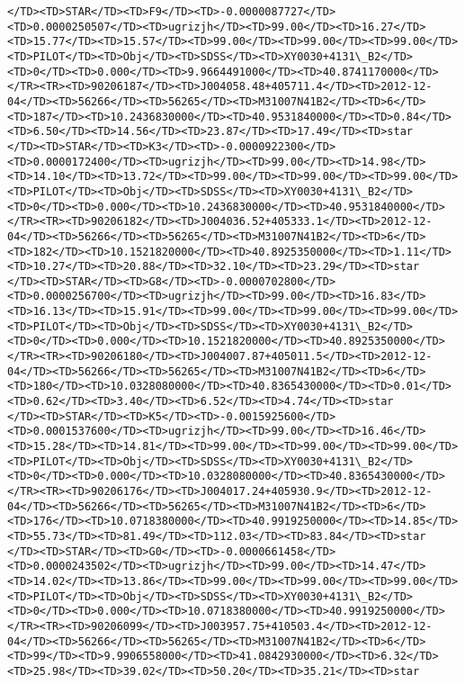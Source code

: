 \documentclass[11pt]{article}
\begin{document}
\begin{Verbatim}[commandchars=\\\{\}]
</TD><TD>STAR</TD><TD>F9</TD><TD>-0.0000087727</TD><TD>0.0000250507</TD><TD>ugrizjh</TD><TD>99.00</TD><TD>16.27</TD><TD>15.77</TD><TD>15.57</TD><TD>99.00</TD><TD>99.00</TD><TD>99.00</TD><TD>PILOT</TD><TD>Obj</TD><TD>SDSS</TD><TD>XY0030+4131\_B2</TD><TD>0</TD><TD>0.000</TD><TD>9.9664491000</TD><TD>40.8741170000</TD></TR><TR><TD>90206187</TD><TD>J004058.48+405711.4</TD><TD>2012-12-04</TD><TD>56266</TD><TD>56265</TD><TD>M31007N41B2</TD><TD>6</TD><TD>187</TD><TD>10.2436830000</TD><TD>40.9531840000</TD><TD>0.84</TD><TD>6.50</TD><TD>14.56</TD><TD>23.87</TD><TD>17.49</TD><TD>star      </TD><TD>STAR</TD><TD>K3</TD><TD>-0.0000922300</TD><TD>0.0000172400</TD><TD>ugrizjh</TD><TD>99.00</TD><TD>14.98</TD><TD>14.10</TD><TD>13.72</TD><TD>99.00</TD><TD>99.00</TD><TD>99.00</TD><TD>PILOT</TD><TD>Obj</TD><TD>SDSS</TD><TD>XY0030+4131\_B2</TD><TD>0</TD><TD>0.000</TD><TD>10.2436830000</TD><TD>40.9531840000</TD></TR><TR><TD>90206182</TD><TD>J004036.52+405333.1</TD><TD>2012-12-04</TD><TD>56266</TD><TD>56265</TD><TD>M31007N41B2</TD><TD>6</TD><TD>182</TD><TD>10.1521820000</TD><TD>40.8925350000</TD><TD>1.11</TD><TD>10.27</TD><TD>20.88</TD><TD>32.10</TD><TD>23.29</TD><TD>star      </TD><TD>STAR</TD><TD>G8</TD><TD>-0.0000702800</TD><TD>0.0000256700</TD><TD>ugrizjh</TD><TD>99.00</TD><TD>16.83</TD><TD>16.13</TD><TD>15.91</TD><TD>99.00</TD><TD>99.00</TD><TD>99.00</TD><TD>PILOT</TD><TD>Obj</TD><TD>SDSS</TD><TD>XY0030+4131\_B2</TD><TD>0</TD><TD>0.000</TD><TD>10.1521820000</TD><TD>40.8925350000</TD></TR><TR><TD>90206180</TD><TD>J004007.87+405011.5</TD><TD>2012-12-04</TD><TD>56266</TD><TD>56265</TD><TD>M31007N41B2</TD><TD>6</TD><TD>180</TD><TD>10.0328080000</TD><TD>40.8365430000</TD><TD>0.01</TD><TD>0.62</TD><TD>3.40</TD><TD>6.52</TD><TD>4.74</TD><TD>star      </TD><TD>STAR</TD><TD>K5</TD><TD>-0.0015925600</TD><TD>0.0001537600</TD><TD>ugrizjh</TD><TD>99.00</TD><TD>16.46</TD><TD>15.28</TD><TD>14.81</TD><TD>99.00</TD><TD>99.00</TD><TD>99.00</TD><TD>PILOT</TD><TD>Obj</TD><TD>SDSS</TD><TD>XY0030+4131\_B2</TD><TD>0</TD><TD>0.000</TD><TD>10.0328080000</TD><TD>40.8365430000</TD></TR><TR><TD>90206176</TD><TD>J004017.24+405930.9</TD><TD>2012-12-04</TD><TD>56266</TD><TD>56265</TD><TD>M31007N41B2</TD><TD>6</TD><TD>176</TD><TD>10.0718380000</TD><TD>40.9919250000</TD><TD>14.85</TD><TD>55.73</TD><TD>81.49</TD><TD>112.03</TD><TD>83.84</TD><TD>star      </TD><TD>STAR</TD><TD>G0</TD><TD>-0.0000661458</TD><TD>0.0000243502</TD><TD>ugrizjh</TD><TD>99.00</TD><TD>14.47</TD><TD>14.02</TD><TD>13.86</TD><TD>99.00</TD><TD>99.00</TD><TD>99.00</TD><TD>PILOT</TD><TD>Obj</TD><TD>SDSS</TD><TD>XY0030+4131\_B2</TD><TD>0</TD><TD>0.000</TD><TD>10.0718380000</TD><TD>40.9919250000</TD></TR><TR><TD>90206099</TD><TD>J003957.75+410503.4</TD><TD>2012-12-04</TD><TD>56266</TD><TD>56265</TD><TD>M31007N41B2</TD><TD>6</TD><TD>99</TD><TD>9.9906558000</TD><TD>41.0842930000</TD><TD>6.32</TD><TD>25.98</TD><TD>39.02</TD><TD>50.20</TD><TD>35.21</TD><TD>star      
\end{Verbatim}
\end{document}
